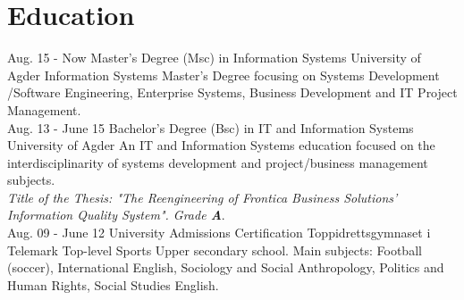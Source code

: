 \documentclass[]{cv-class}
\begin{document}
\section{Education}
\begin{entrylist}
  \entry
    {Aug. 15 - Now}
    {Master's Degree (Msc) in Information Systems}
    {University of Agder}
    {Information Systems Master's Degree focusing on Systems Development
    /Software Engineering, Enterprise Systems, Business Development and 
    IT Project Management.\\}
  \entry
    {Aug. 13 - June 15}
    {Bachelor's Degree (Bsc) in IT and Information Systems}
    {University of Agder}
    {An IT and Information Systems education focused on the interdisciplinarity of
    systems development and project/business management subjects.\\
    \emph{Title of the Thesis: "The Reengineering of Frontica Business Solutions' 
    Information Quality System". Grade \textbf{A}}.\\}
  \entry
    {Aug. 09 - June 12}
    {University Admissions Certification}
    {Toppidrettsgymnaset i Telemark}
    {Top-level Sports Upper secondary school.
    Main subjects: Football (soccer), International English, Sociology and Social Anthropology,
    Politics and Human Rights, Social Studies English.}
\end{entrylist}
\end{document}
